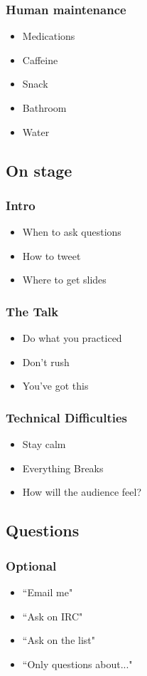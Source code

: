 \documentclass{beamer}
\begin{document}
\begin{frame}[fragile]
\frametitle{Human maintenance}
\begin{itemize}[<+(1)->]
\item Medications
\item Caffeine
\item Snack
\item Bathroom
\item Water
\end{itemize}
\end{frame}

\subsection{On stage}

\begin{frame}[fragile]
\frametitle{Intro}
\begin{itemize}[<+(1)->]
\item When to ask questions
\item How to tweet
\item Where to get slides
\end{itemize}
\end{frame}

\begin{frame}[fragile]
\frametitle{The Talk}
\begin{itemize}[<+(1)->]
\item Do what you practiced
\item Don't rush
\item You've got this
\end{itemize}
\end{frame}

\begin{frame}[fragile]
\frametitle{Technical Difficulties}
\begin{itemize}[<+(1)->]
\item Stay calm
\item Everything Breaks
\item How will the audience feel?
\end{itemize}
\end{frame}

\subsection{Questions}
\begin{frame}[fragile]
\frametitle{Optional}
\begin{itemize}[<+(1)->]
\item ``Email me"
\item ``Ask on IRC"
\item ``Ask on the list"
\item ``Only questions about..."
\end{itemize}
\end{frame}
\end{document}
